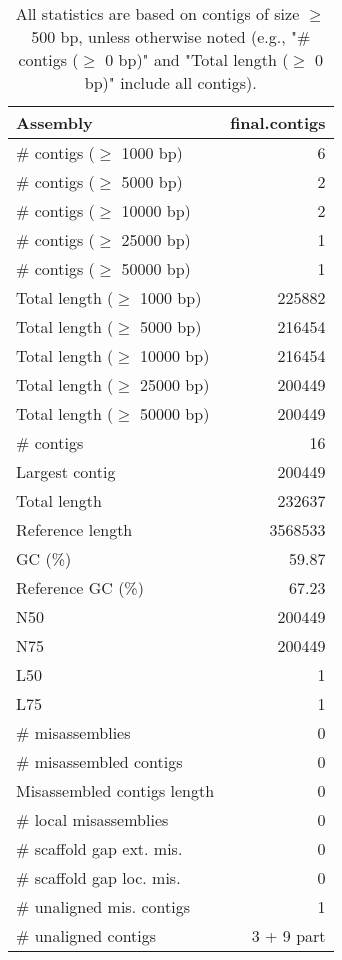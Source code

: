\documentclass[12pt,a4paper]{article}
\begin{document}
\begin{table}[ht]
\begin{center}
\caption{All statistics are based on contigs of size $\geq$ 500 bp, unless otherwise noted (e.g., "\# contigs ($\geq$ 0 bp)" and "Total length ($\geq$ 0 bp)" include all contigs).}
\begin{tabular}{|l*{1}{|r}|}
\hline
Assembly & final.contigs \\ \hline
\# contigs ($\geq$ 1000 bp) & 6 \\ \hline
\# contigs ($\geq$ 5000 bp) & 2 \\ \hline
\# contigs ($\geq$ 10000 bp) & 2 \\ \hline
\# contigs ($\geq$ 25000 bp) & 1 \\ \hline
\# contigs ($\geq$ 50000 bp) & 1 \\ \hline
Total length ($\geq$ 1000 bp) & 225882 \\ \hline
Total length ($\geq$ 5000 bp) & 216454 \\ \hline
Total length ($\geq$ 10000 bp) & 216454 \\ \hline
Total length ($\geq$ 25000 bp) & 200449 \\ \hline
Total length ($\geq$ 50000 bp) & 200449 \\ \hline
\# contigs & 16 \\ \hline
Largest contig & 200449 \\ \hline
Total length & 232637 \\ \hline
Reference length & 3568533 \\ \hline
GC (\%) & 59.87 \\ \hline
Reference GC (\%) & 67.23 \\ \hline
N50 & 200449 \\ \hline
N75 & 200449 \\ \hline
L50 & 1 \\ \hline
L75 & 1 \\ \hline
\# misassemblies & 0 \\ \hline
\# misassembled contigs & 0 \\ \hline
Misassembled contigs length & 0 \\ \hline
\# local misassemblies & 0 \\ \hline
\# scaffold gap ext. mis. & 0 \\ \hline
\# scaffold gap loc. mis. & 0 \\ \hline
\# unaligned mis. contigs & 1 \\ \hline
\# unaligned contigs & 3 + 9 part \\ \hline

\end{tabular}
\end{center}
\end{table}
\end{document}
